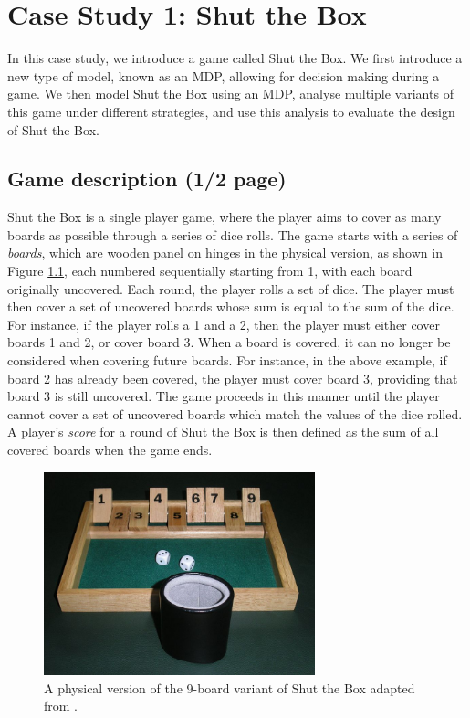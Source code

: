\chapter{Case Study 1: Shut the Box}
\label{cs1}

In this case study, we introduce a game called Shut the Box. We first introduce a new type of model, known as an MDP, allowing for decision making during a game. We then model Shut the Box using an MDP, analyse multiple variants of this game under different strategies, and use this analysis to evaluate the design of Shut the Box.
\section{Game description (1/2 page)}
\label{cs1:stb_description}

Shut the Box is a single player game, where the player aims to cover as many boards as possible through a series of dice rolls. The game starts with a series of \emph{boards}, which are wooden panel on hinges in the physical version, as shown in Figure \ref{cs1:physical_stb}, each numbered sequentially starting from 1, with each board originally uncovered. Each round, the player rolls a set of dice. The player must then cover a set of uncovered boards whose sum is equal to the sum of the dice. For instance, if the player rolls a 1 and a 2, then the player must either cover boards 1 and 2, or cover board 3. When a board is covered, it can no longer be considered when covering future boards. For instance, in the above example, if board 2 has already been covered, the player must cover  board 3, providing that board 3 is still uncovered. The game proceeds in this manner until the player cannot cover a set of uncovered boards which match the values of the dice rolled. A player's \emph{score} for a round of Shut the Box is then defined as the sum of all covered boards when the game ends.

\begin{figure}[h]
    \centering
    \includegraphics[width=0.7\textwidth]{images/shut_the_box.jpg}
    \caption{A physical version of the 9-board variant of Shut the Box adapted from \cite{wikipedia_deutsch_2006}.}
    \label{cs1:physical_stb}
\end{figure}

